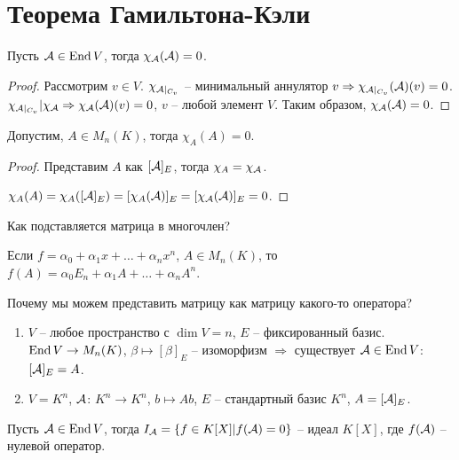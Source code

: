 \documentclass[main]{subfiles}
\begin{document}
\chapter{Теорема Гамильтона-Кэли}

\begin{theorem}
    Пусть $\mathcal{A} \in \operatorname{End} V$, тогда $\chi_{\mathcal{A}}(\mathcal{A}) = 0$.
\end{theorem}

\begin{proof}
    Рассмотрим $v \in V$.  $\chi_{\mathcal{A} |_{C_v}}$ -- минимальный аннулятор $v \Rightarrow \chi_{\mathcal{A} |_{C_v}}(\mathcal{A})(v) = 0$.
    $\chi_{\mathcal{A} |_{C_v}} | \chi_{\mathcal{A}} \Rightarrow \chi_{\mathcal{A}} (\mathcal{A})(v) = 0$,
    $v$ -- любой элемент $V$. Таким образом, $\chi_{\mathcal{A}}(\mathcal{A}) = 0$.
\end{proof}

\begin{corollary} 
    Допустим, $A \in M_n(K)$, тогда $\chi_A(A)=0$.
\end{corollary}

\begin{proof}
    Представим $A$ как $[\mathcal{A}]_E$, тогда $\chi_A = \chi_{\mathcal{A}}$.

    $\chi_A (A) = \chi_A ([\mathcal{A}]_E) = [\chi_A(\mathcal{A})]_E =[\chi_{\mathcal{A}}(\mathcal{A})]_E = 0$.
\end{proof}

Как подставляется матрица в многочлен?

Если $f = \alpha_0 + \alpha_1 x + \ldots + \alpha_n x^n$, $A \in M_n(K)$, то
$f(A) = \alpha_0 E_n + \alpha_1 A + \ldots + \alpha_n A^n$.

Почему мы можем представить матрицу как матрицу какого-то оператора?
\begin{enumerate}
    \item $V$ -- любое пространство с $\dim V = n$, $E$ -- фиксированный базис.
          $\operatorname{End} V \rightarrow M_n(K)$, $\beta \mapsto [\beta]_E$ -- изоморфизм $\Rightarrow$ существует $\mathcal{A} \in \operatorname{End} V$: $[\mathcal{A}]_E = A$.

    \item $V = K^n$, $\mathcal{A}$: $K^n \rightarrow K^n$, $b \mapsto Ab$, $E$ -- стандартный базис $K^n$, $A = [\mathcal{A}]_E$.
\end{enumerate}

\begin{proposition}
    Пусть $\mathcal{A} \in \operatorname{End} V$, тогда $I_{\mathcal{A}} = \{f\in K[X] | f(\mathcal{A}) = 0\}$ -- идеал $K[X]$, где $f(\mathcal{A})$ -- нулевой оператор.
\end{proposition}
\end{document}
